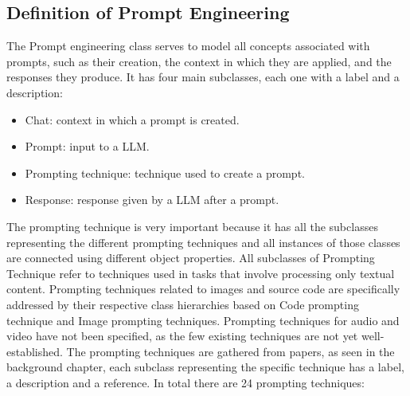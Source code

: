 \subsection{Definition of Prompt Engineering}
\label{subsection:4_3_5_prompt}
The Prompt engineering class serves to model all concepts associated with prompts, such as their creation, the context in which they are applied, and the responses they produce.
It has four main subclasses, each one with a label and a description:
\begin{itemize}
    \item Chat: context in which a prompt is created. 
    \item Prompt: input to a LLM.
    \item Prompting technique: technique used to create a prompt.
    \item Response: response given by a LLM after a prompt.
\end{itemize}
The prompting technique is very important because it has all the subclasses representing the different prompting techniques and all instances of those classes are connected using different object properties.
All subclasses of Prompting Technique refer to techniques used in tasks that involve processing only textual content.
Prompting techniques related to images and source code are specifically addressed by their respective class hierarchies based on Code prompting technique and Image prompting techniques.
Prompting techniques for audio and video have not been specified, as the few existing techniques are not yet well-established.
The prompting techniques are gathered from papers, as seen in the background chapter, each subclass representing the specific technique has a label, a description and a reference.
In total there are 24 prompting techniques:
